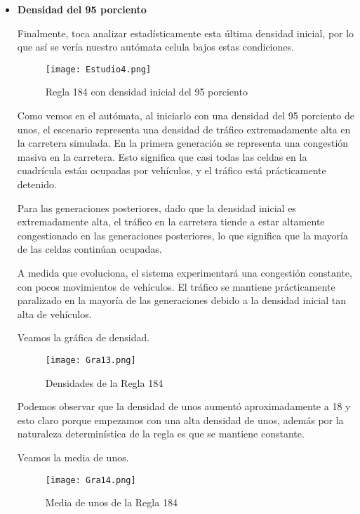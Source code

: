 \documentclass{article}
\begin{document}
\begin{itemize}
		\item \textbf{Densidad del 95 porciento }
		 
		Finalmente, toca analizar estadísticamente esta última densidad inicial, por lo que así se vería nuestro autómata celula bajos estas condiciones. 
		
		\begin{figure}[h]
			\centering       
			\texttt{[image: Estudio4.png]}
			\caption{Regla 184 con densidad inicial del 95 porciento}
			\label{fig:mi_imagen1}
		\end{figure}
		\vspace{300pt}
		
		Como vemos en el autómata, al iniciarlo con una densidad del 95 porciento de unos, el escenario representa una densidad de tráfico extremadamente alta en la carretera simulada.
		En la primera generación se representa una congestión masiva en la carretera. Esto significa que casi todas las celdas en la cuadrícula están ocupadas por vehículos, y el tráfico está prácticamente detenido.
		
		Para las generaciones posteriores, dado que la densidad inicial es extremadamente alta, el tráfico en la carretera tiende a estar altamente congestionado en las generaciones posteriores, lo que significa que la mayoría de las celdas continúan ocupadas.
		
		A medida que evoluciona, el sistema experimentará una congestión constante, con pocos movimientos de vehículos. El tráfico se mantiene prácticamente paralizado en la mayoría de las generaciones debido a la densidad inicial tan alta de vehículos.
		
		Veamos la gráfica de densidad.
		
		\begin{figure}[h]
			\centering       
			\texttt{[image: Gra13.png]}
			\caption{Densidades de la Regla 184}
			\label{fig:mi_imagen1}
		\end{figure}
		
		Podemos observar que la densidad de unos aumentó aproximadamente a 18 y esto claro porque empezamos con una alta densidad de unos, además por la naturaleza determinística de la regla es que se mantiene constante.
		
		Veamos la media de unos. 
		
		\begin{figure}[h]
			\centering       
			\texttt{[image: Gra14.png]}
			\caption{Media de unos de la Regla 184}
			\label{fig:mi_imagen1}
		\end{figure}
		

\end{itemize}
\end{document}
